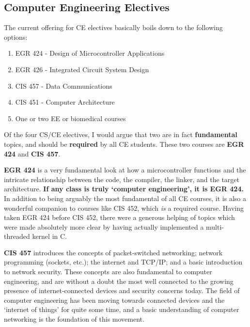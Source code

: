 \documentclass[12pt]{article}
\numberwithin{figure}{section}
\numberwithin{equation}{section}
\begin{document}
{\subsection{Computer Engineering Electives}\label{electives}
The current offering for CE electives basically boils down to the
following options:

\begin{enumerate}
\itemsep1pt\parskip0pt
\item EGR 424 - Design of Microcontroller Applications
\item EGR 426 - Integrated Circuit System Design
\item CIS 457 - Data Communications
\item CIS 451 - Computer Architecture
\item One or two EE or biomedical courses
\end{enumerate}

Of the four CS/CE electives, I would argue that two are in fact
\textbf{fundamental} topics, and should be \textbf{required} by all CE
students. These two courses are \textbf{EGR 424} and \textbf{CIS 457}.

\bigskip

\textbf{EGR 424} is a very fundamental look at how a microcontroller
functions and the intricate relationship between the code, the compiler,
the linker, and the target architecture. \textbf{If any class is truly
`computer engineering', it is EGR 424.} In addition to being arguably
the most fundamental of all CE courses, it is also a wonderful companion
to courses like CIS 452, which \emph{is} a required course. Having taken
EGR 424 before CIS 452, there were a generous helping of topics which
were made absolutely more clear by having actually implemented a
multi-threaded kernel in C.

\bigskip

\textbf{CIS 457} introduces the concepts of packet-switched networking;
network programming (sockets, etc.); the internet and TCP/IP; and a
basic introduction to network security. These concepts are also
fundamental to computer engineering, and are without a doubt the most
well connected to the growing presence of internet-connected devices and
security concerns today. The field of computer engineering has been
moving towards connected devices and the `internet of things' for quite
some time, and a basic understanding of computer networking is the
foundation of this movement.

\bigskip

}
\end{document}
